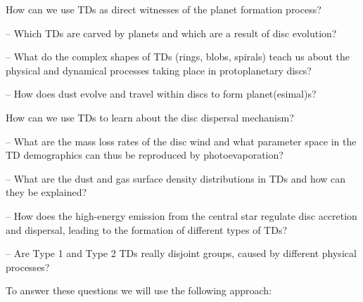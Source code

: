 \documentclass[10pt,fleqn,twoside]{article}
\begin{document}
\begin{highlight}
How can we use TDs as direct witnesses of the planet formation process?
\end{highlight}
\begin{compactitemize}
\item[--] Which TDs are carved by planets and which are a result of disc evolution? 
\item[--] What do the complex shapes of TDs (rings, blobs, spirals) teach us about the physical and
dynamical processes taking place in protoplanetary discs?
\item[--] How does dust evolve and travel within discs to form planet(esimal)s?
\end{compactitemize}
\vspace{1em}
\begin{highlight}
How can we use TDs to learn about the disc dispersal mechanism?
\end{highlight}
\begin{compactitemize}
\item[--] What are the mass loss rates of the disc wind and
  what parameter space in the TD demographics can thus be reproduced
  by photoevaporation?
\item[--] What are the dust and gas surface density
  distributions in TDs and how can they be
  explained?
\item[--] How does the high-energy emission from the central
  star regulate disc accretion and dispersal, leading to the formation
  of different types of TDs?
\item[--] Are Type 1 and Type 2 TDs really disjoint groups, caused by 
  different physical processes?
\end{compactitemize} 
\vspace{1em}

To answer these questions we will use the following approach: 
\end{document}
